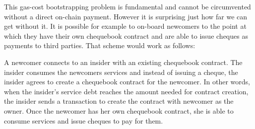 This gas-cost bootstrapping problem is fundamental and cannot be circumvented without a direct on-chain payment. However it is surprising just how far we can get without it. It is possible for example to on-board newcomers to the point at which they have their own chequebook contract and are able to issue cheques as payments to third parties. That scheme would work as follows:
 
A newcomer connects to  an insider with an existing chequebook contract. The insider consumes the newcomers services and instead of issuing a cheque, the insider agrees to create a chequebook contract for the newcomer. In other words, when the insider's service debt reaches the amount needed for contract creation, the insider sends a transaction to create the contract with newcomer as the owner. Once the newcomer has her own chequebook contract, she is able to consume services and issue cheques to pay for them.
 
